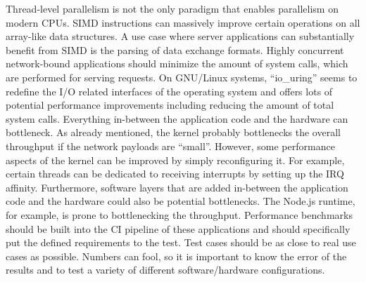 Thread-level parallelism is not the only paradigm that enables parallelism on modern CPUs. SIMD instructions can massively improve certain operations on all array-like data structures.  A use case where server applications can substantially benefit from SIMD is the parsing of data exchange formats. \newline
Highly concurrent network-bound applications should minimize the amount of system calls, which are performed for serving requests. On GNU/Linux systems, “io\_uring” seems to redefine the I/O related interfaces of the operating system and offers lots of potential performance improvements including reducing the amount of total system calls. 
Everything in-between the application code and the hardware can bottleneck. As already mentioned, the kernel probably bottlenecks the overall throughput if the network payloads are “small”. However, some performance aspects of the kernel can be improved by simply reconfiguring it. For example, certain threads can be dedicated to receiving interrupts by setting up the IRQ affinity. 
Furthermore, software layers that are added in-between the application code and the hardware could also be potential bottlenecks. The Node.js runtime, for example, is prone to bottlenecking the throughput. \newline
Performance benchmarks should be built into the CI pipeline of these applications and should specifically put the defined requirements to the test. Test cases should be as close to real use cases as possible. Numbers can fool, so it is important to know the error of the results and to test a variety of different software/hardware configurations.

